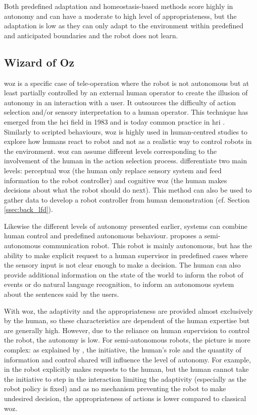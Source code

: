 	Both predefined adaptation and homeostasis-based methods score highly in autonomy and can have a moderate to high level of appropriateness, but the adaptation is low as they can only adapt to the environment within predefined and anticipated boundaries and the robot does not learn.

\subsection{Wizard of Oz} \label{subsec:WoZ}

	\acrfull{woz} is a specific case of tele-operation where the robot is not autonomous but at least partially controlled by an external human operator to create the illusion of autonomy in an interaction with a user. It outsources the difficulty of action selection and/or sensory interpretation to a human operator. This technique has emerged from the \gls{hci} field in 1983 \citep{kelley1983empirical} and is today common practice in \gls{hri} \citep{riek2012wizard}. Similarly to scripted behaviours, \gls{woz} is highly used in human-centred studies to explore how humans react to robot and not as a realistic way to control robots in the environment. \gls{woz} can assume different levels corresponding to the involvement of the human in the action selection process. \cite{baxter2016characterising} differentiate two main levels: perceptual \gls{woz} (the human only replace sensory system and feed information to the robot controller) and cognitive \gls{woz} (the human makes decisions about what the robot should do next). This method can also be used to gather data to develop a robot controller from human demonstration (cf. Section \ref{ssec:back_lfd}).
	
	Likewise the different levels of autonomy presented earlier, systems can combine human control and predefined autonomous behaviour. \citet{shiomi2008semi} proposes a semi-autonomous communication robot. This robot is mainly autonomous, but has the ability to make explicit request to a human supervisor in predefined cases where the sensory input is not clear enough to make a decision. The human can also provide additional information on the state of the world to inform the robot of events or do natural language recognition, to inform an autonomous system about the sentences said by the users. %
	
	With \gls{woz}, the adaptivity and the appropriateness are provided almost exclusively by the human, so these characteristics are dependent of the human expertise but are generally high. However, due to the reliance on human supervision to control the robot, the autonomy is low. For semi-autonomous robots, the picture is more complex: as explained by \cite{beer2014toward}, the initiative, the human's role and the quantity of information and control shared will influence the level of autonomy. For example, in \citet{shiomi2008semi} the robot explicitly makes requests to the human, but the human cannot take the initiative to step in the interaction limiting the adaptivity (especially as the robot policy is fixed) and as no mechanism preventing the robot to make undesired decision, the appropriateness of actions is lower compared to classical \gls{woz}.

